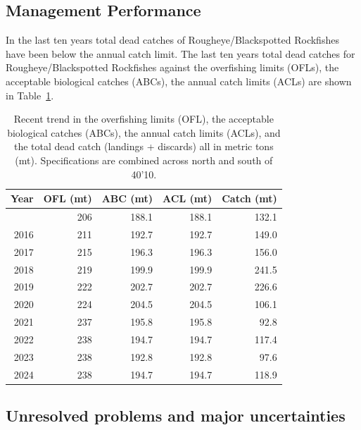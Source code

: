 \documentclass[
]{scrartcl}
\begin{document}
\subsection{Management Performance}\label{management-performance}

In the last ten years total dead catches of Rougheye/Blackspotted
Rockfishes have been below the annual catch limit. The last ten years
total dead catches for Rougheye/Blackspotted Rockfishes against the
overfishing limits (OFLs), the acceptable biological catches (ABCs), the
annual catch limits (ACLs) are shown in Table~\ref{tbl-es-management}.

\begingroup
\fontsize{9.0pt}{10.8pt}\selectfont

\begin{longtable}{rrrrr}

\caption{\label{tbl-es-management}Recent trend in the overfishing limits
(OFL), the acceptable biological catches (ABCs), the annual catch limits
(ACLs), and the total dead catch (landings + discards) all in metric
tons (mt). Specifications are combined across north and south of 40'10.}

\tabularnewline

\toprule
Year & OFL (mt) & ABC (mt) & ACL (mt) & Catch (mt) \\ 
\midrule\addlinespace[2.5pt]
2015 & 206 & 188.1 & 188.1 & 132.1 \\ 
2016 & 211 & 192.7 & 192.7 & 149.0 \\ 
2017 & 215 & 196.3 & 196.3 & 156.0 \\ 
2018 & 219 & 199.9 & 199.9 & 241.5 \\ 
2019 & 222 & 202.7 & 202.7 & 226.6 \\ 
2020 & 224 & 204.5 & 204.5 & 106.1 \\ 
2021 & 237 & 195.8 & 195.8 & 92.8 \\ 
2022 & 238 & 194.7 & 194.7 & 117.4 \\ 
2023 & 238 & 192.8 & 192.8 & 97.6 \\ 
2024 & 238 & 194.7 & 194.7 & 118.9 \\ 
\bottomrule

\end{longtable}

\endgroup

\subsection{Unresolved problems and major
uncertainties}\label{unresolved-problems-and-major-uncertainties}
\end{document}
